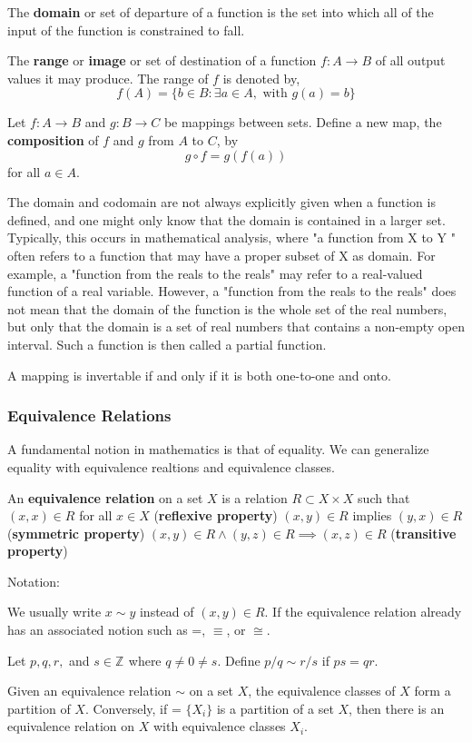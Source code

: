 \documentclass[11pt]{article} %
\newcommand\Z[1]{\text{$\mathbb{Z}^{#1}$}}
\renewcommand\P{\text{$\mathcal{P}$}}
\newcommand\set[1]{\{#1\}}
\begin{document}
{
The \textbf{domain} or set of departure of a function is the set into which all of the input of the function is constrained to fall.
}

{
The  \textbf{range} or \textbf{image} or set of destination of a function $f: A \to B$ of all output values it may produce. The range of $f$ is denoted by,
$$
f(A) =\set{b \in B: \exists a \in A, \text{ with } g(a) =b}
$$
}

{
Let $f: A \to B$ and $g: B \to C$ be mappings between sets. Define a new map, the \textbf{composition} of $f$ and $g$ from $A$ to $C$, by
$$
g \circ f = g(f(a))
$$
for all $a \in A$.
}

The domain and codomain are not always explicitly given when a function is defined, and one might only know that the domain is contained in a larger set. Typically, this occurs in mathematical analysis, where "a function from X to Y " often refers to a function that may have a proper subset of X as domain. For example, a "function from the reals to the reals" may refer to a real-valued function of a real variable. However, a "function from the reals to the reals" does not mean that the domain of the function is the whole set of the real numbers, but only that the domain is a set of real numbers that contains a non-empty open interval. Such a function is then called a partial function. 

{A mapping is invertable if and only if it is both one-to-one and onto.}
{}
\newpage

\subsubsection{Equivalence Relations}
A fundamental notion in mathematics is that of equality. We can generalize equality with equivalence realtions and equivalence classes.

{
An \textbf{equivalence relation} on a set $X$ is a relation $R \subset X \times X$ such that
\points
{$(x,x) \in R$ for all $x \in X$ (\textbf{reflexive property})}
{$(x,y) \in R$ implies $(y, x) \in R$ (\textbf{symmetric property})}
{$(x,y) \in R \wedge (y, z) \in R \implies (x, z) \in R$ (\textbf{transitive property})}
}

\noindent
Notation:

We usually write $x \sim y$ instead of $(x,y) \in R$. If the equivalence relation already has an associated notion such as =, $\equiv$, or $\cong$.

\example{}
{Let $p, q, r,$ and $s \in \Z{}$ where $q \ne 0 \ne s$. Define $p/q \sim r/s$ if $ps = qr$.}

{Given an equivalence relation $\sim$ on a set $X$, the equivalence classes of $X$ form a partition of $X$. Conversely, if \P = $\set{X_i}$ is a partition of a set $X$, then there is an equivalence relation on $X$ with equivalence classes $X_i$.}
\end{document}
